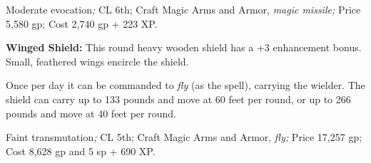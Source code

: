 Moderate evocation\textit{; }CL 6th; Craft Magic Arms and Armor, \textit{magic 
missile; }Price 5,580 gp; Cost 2,740 gp + 223 XP.

\textbf{Winged Shield:} This round heavy wooden shield has a +3 enhancement bonus. 
Small, feathered wings encircle the shield.

Once per day it can be commanded to \textit{fly }(as the spell), carrying the wielder. 
The shield can carry up to 133 pounds and move at 60 feet per round, or up to 266 
pounds and move at 40 feet per round.

Faint transmutation\textit{; }CL 5th; Craft Magic Arms and Armor, \textit{fly; 
}Price 17,257 gp; Cost 8,628 gp and 5 sp + 690 XP.

